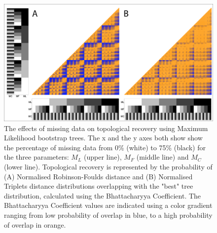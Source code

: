\begin{figure} 
\centering
    \includegraphics[width=1\textwidth]{SupplementaryFigures/PairwiseComp-Boot-RF+Tr-colour.png} %
    \caption{The effects of missing data on topological recovery using Maximum Likelihood bootstrap trees. The x and the y axes both show show the percentage of missing data from 0\% (white) to 75\% (black) for the three parameters: $M_{L}$ (upper line), $M_{F}$ (middle line) and $M_{C}$ (lower line). Topological recovery is represented by the probability of (A) Normalised Robinson-Foulds distance and (B) Normalised Triplets distance distributions overlapping with the "best" tree distribution, calculated using the Bhattacharyya Coefficient. The Bhattacharyya Coefficient values are indicated using a color gradient ranging from low probability of overlap in blue, to a high probability of overlap in orange.}
\label{Fig_Supp_paircomp_Boot}
\end{figure} 


